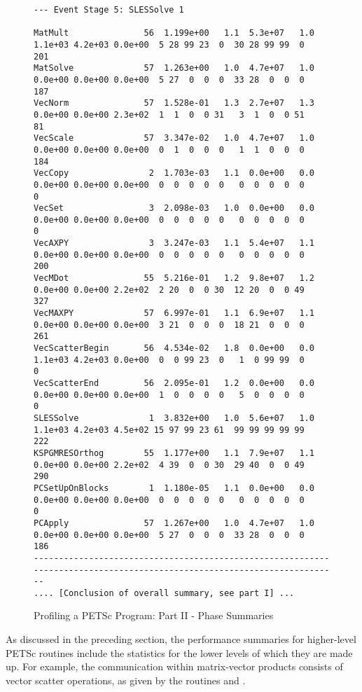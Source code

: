 \begin{figure}[tb]
{\begin{verbatim}
--- Event Stage 5: SLESSolve 1

MatMult               56  1.199e+00   1.1  5.3e+07   1.0  1.1e+03 4.2e+03 0.0e+00  5 28 99 23  0  30 28 99 99  0   201
MatSolve              57  1.263e+00   1.0  4.7e+07   1.0  0.0e+00 0.0e+00 0.0e+00  5 27  0  0  0  33 28  0  0  0   187
VecNorm               57  1.528e-01   1.3  2.7e+07   1.3  0.0e+00 0.0e+00 2.3e+02  1  1  0  0 31   3  1  0  0 51    81
VecScale              57  3.347e-02   1.0  4.7e+07   1.0  0.0e+00 0.0e+00 0.0e+00  0  1  0  0  0   1  1  0  0  0   184
VecCopy                2  1.703e-03   1.1  0.0e+00   0.0  0.0e+00 0.0e+00 0.0e+00  0  0  0  0  0   0  0  0  0  0     0
VecSet                 3  2.098e-03   1.0  0.0e+00   0.0  0.0e+00 0.0e+00 0.0e+00  0  0  0  0  0   0  0  0  0  0     0
VecAXPY                3  3.247e-03   1.1  5.4e+07   1.1  0.0e+00 0.0e+00 0.0e+00  0  0  0  0  0   0  0  0  0  0   200
VecMDot               55  5.216e-01   1.2  9.8e+07   1.2  0.0e+00 0.0e+00 2.2e+02  2 20  0  0 30  12 20  0  0 49   327
VecMAXPY              57  6.997e-01   1.1  6.9e+07   1.1  0.0e+00 0.0e+00 0.0e+00  3 21  0  0  0  18 21  0  0  0   261
VecScatterBegin       56  4.534e-02   1.8  0.0e+00   0.0  1.1e+03 4.2e+03 0.0e+00  0  0 99 23  0   1  0 99 99  0     0
VecScatterEnd         56  2.095e-01   1.2  0.0e+00   0.0  0.0e+00 0.0e+00 0.0e+00  1  0  0  0  0   5  0  0  0  0     0
SLESSolve              1  3.832e+00   1.0  5.6e+07   1.0  1.1e+03 4.2e+03 4.5e+02 15 97 99 23 61  99 99 99 99 99   222
KSPGMRESOrthog        55  1.177e+00   1.1  7.9e+07   1.1  0.0e+00 0.0e+00 2.2e+02  4 39  0  0 30  29 40  0  0 49   290
PCSetUpOnBlocks        1  1.180e-05   1.1  0.0e+00   0.0  0.0e+00 0.0e+00 0.0e+00  0  0  0  0  0   0  0  0  0  0     0
PCApply               57  1.267e+00   1.0  4.7e+07   1.0  0.0e+00 0.0e+00 0.0e+00  5 27  0  0  0  33 28  0  0  0   186
------------------------------------------------------------------------------------------------------------------------
.... [Conclusion of overall summary, see part I] ...
\end{verbatim}
}
\caption{Profiling a PETSc Program: Part II - Phase Summaries}
\label{fig:exparprof2}
\end{figure}

As discussed in the preceding section, the performance summaries for
higher-level PETSc routines include the statistics for the lower
levels of which they are made up.  For example, the communication within
matrix-vector products  consists of vector scatter
operations, as given by the routines  and . 
%
%

